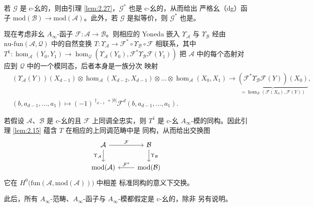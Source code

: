 若 $\mathcal G$ 是 c-幺的，则由引理 \ref{lem:2.27}，$\mathcal G^*$ 也是 c-幺的，从而给出
严格幺（dg）函子 $\mathrm{mod}(\mathcal B)\to\mathrm{mod}(\mathcal A)$。此外，若
$\mathcal G$ 是拟等价，则 $\mathcal G^*$ 也是。

现在考虑非幺 $A_\infty$-函子 $\mathcal F:\mathcal A\to\mathcal B$。则相应的
Yoneda 嵌入 $\Upsilon_{\mathcal A}$ 与 $\Upsilon_{\mathcal B}$ 经由
$\mathrm{nu\text{-}fun}(\mathcal A,\mathcal Q)$ 中的自然变换
$T:\Upsilon_{\mathcal A}\to\mathcal F^*\circ\Upsilon_{\mathcal B}\circ\mathcal F$
相联系，其中 $T^1:\hom_{\mathcal A}(Y_0,Y_1)\to\hom_{\mathcal Q}(\Upsilon_
{\mathcal A}(Y_0),\mathcal F^*\Upsilon_{\mathcal B}\mathcal F(Y_1))$ 把
$\mathcal A$ 中的每个态射对应到 $\mathcal Q$ 中的一个模同态，后者本身是一族分次
映射
\begin{equation}\label{eq:2.33}
  \begin{aligned}
    &(\Upsilon_{\mathcal A}(Y))(X_{d-1})\otimes\hom_{\mathcal A}(X_{d-2},
    X_{d-1})\otimes\dots\otimes\hom_{\mathcal A}(X_0,X_1)\longrightarrow
    \underbrace{(\mathcal F^*\Upsilon_{\mathcal B}\mathcal F(Y))(X_0)}
    _{=\hom_{\mathcal B}(\mathcal F(X_0),\mathcal F(Y))},\\
    &(b,a_{d-1},\dots,a_1)\longmapsto(-1)^{\dagger_{d-1}+|b|}
    \mathcal F^d(b,a_{d-1},\dots,a_1).
  \end{aligned}
\end{equation}

\begin{Rem}\label{rem:2.38}
若假设 $\mathcal A$、$\mathcal B$ 是 c-幺的且 $\mathcal F$ 上同调全忠实，则 $T^1$
是 c-幺 $A_\infty$-模的同构。因此引理 \ref{lem:2.15} 蕴含 $T$ 在相应的上同调范畴中是
同构，从而给出交换图
\[
  \begin{tikzcd}
    \mathcal A \arrow[r, "\mathcal F"] \arrow[d, "\Upsilon_{\mathcal A}"']
    & \mathcal B \arrow[d, "\Upsilon_{\mathcal B}"]\\
    \mathrm{mod}(\mathcal A) & \mathrm{mod}(\mathcal B)
    \arrow[l, "\mathcal F^*"']
  \end{tikzcd}
\]
它在 $H^0\bigl(\mathrm{fun}(\mathcal A,\mathrm{mod}(\mathcal A))\bigr)$ 中相差
标准同构的意义下交换。
\end{Rem}

此后，所有 $A_\infty$-范畴、$A_\infty$-函子与 $A_\infty$-模都假定是 c-幺的，除非
另有说明。
